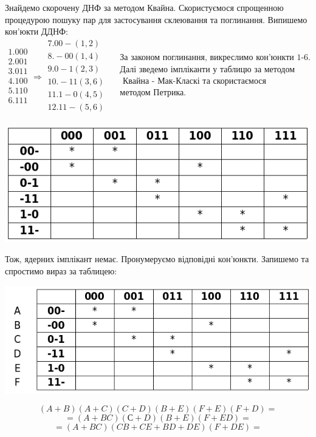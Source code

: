 \documentclass[14pt,a4paper]{scrartcl}
\theoremstyle{definition}
\theoremstyle{remark}
\theoremstyle{definition}
\theoremstyle{definition}
\begin{document}
  Знайдемо скорочену ДНФ за методом Квайна. Скористуємося спрощенною процедурою пошуку пар для застосування склеювання та поглинання. Випишемо кон'юкти ДДНФ:\\
  $$
  \begin{gathered}
 1.  000\\
 2.  001\\
 3.  011\\
 4.  100\\
 5.  110\\
 6.  111\\
  \end{gathered}
 \Longrightarrow
 \begin{gathered}
7. 00-(1,2)\\
8. -00(1,4)\\
9. 0-1(2,3)\\
10. -11(3,6)\\
11. 1-0(4,5)\\
12. 11-(5,6)\\
 \end{gathered}
 \quad
 \begin{gathered}
 \text{За законом поглинання, викреслимо кон'юнкти 1-6.}\\
 \text{Далі зведемо імпліканти у таблицю за методом}\\
 \text{ Квайна - Мак-Класкі та скористаємося }\\
 \text{методом Петрика.}\\
 \end{gathered}
  $$
 \begin{center}
 \includegraphics[scale=0.5]{tabl4.png}
 \end{center}
 Тож, ядерних імплікант немає. Пронумеруємо відповідні кон'юнкти. Запишемо та спростимо вираз за таблицею:\\
 \begin{center}
   \includegraphics[scale=0.5]{tabl3}
 \end{center}
 $$
(A+B)(A+C)(C+D)(B+E)(F+E)(F+D) =
 $$
 $$
=(A+BC)(С+D)(B+E)(F+ED)=
$$
$$
=(A+BC)(CB + CE + BD + DE)(F+DE)=
$$
\end{document}
